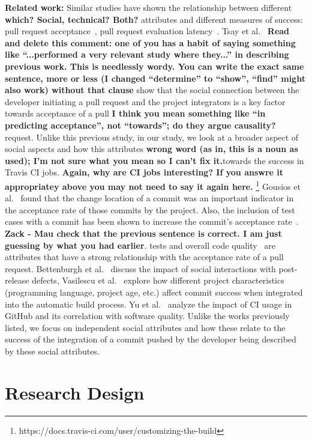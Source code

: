\documentclass[10pt, conference]{IEEEtran}
\newcommand{\todo}[1]
  {{\scriptsize \textbf{\color{red} {#1}}}}
\begin{document}
\textbf{Related work:}
Similar studies have shown the relationship between different\todo{which?
  Social, technical?  Both?} attributes and 
different measures of success: pull request acceptance~\cite{gousios14, 
gousios15,tsay14icse,tsay14fse}, pull request evaluation latency~\cite{Yu15}.
Tsay et al.~\cite{tsay14icse} \todo{Read and delete this comment: one of you has
  a habit of saying something like ``...performed a very relevant study where
  they...'' in describing previous work.  This is needlessly wordy.  You can
  write the exact same sentence, more or less (I changed ``determine'' to
  ``show'', ``find'' might also work) without that clause} 
show that the social connection between the developer initiating a
pull request and the project integrators is a key factor towards acceptance of a pull 
\todo{I think you mean something like ``in predicting acceptance'', not
  ``towards''; do they argue causality?}
request. Unlike this previous study, in our study, we look at a broader aspect of 
social aspects and how this attributes\todo{wrong word (as in, this is a noun as
  used); I'm not sure what you mean so I can't fix it.}towards the success in Travis
CI jobs.\todo{Again, why are CI jobs interesting?  If you answre it appropriatey
  above you may not need to say it again here.} \footnote{https://docs.travis-ci.com/user/customizing-the-build} 
Gousios et al.~\cite{gousios14} found that the change location of a commit was
an important indicator in the acceptance rate of those commits by the project.
Also, the inclusion of test cases with a commit has been shown to increase the
commit's acceptance rate~\cite{gousios15}.\todo{Zack - Mau check that the
previous sentence is correct.  I am just guessing by what you had earlier}.
tests and overall code quality~\cite{gousios15} are attributes that have a 
strong relationship with the acceptance rate of a pull request.
 Bettenburgh et 
al.~\cite{bettenburgh10} discuss the impact of social interactions with 
post-release defects, Vasilescu et al.~\cite{vasilescu14} explore how different 
project characteristics (programming language, project age, etc.) affect commit 
success when integrated into the automatic build process. Yu et al.~\cite{yu16} 
analyze the impact of CI usage in GitHub and its correlation with software 
quality. Unlike the works previously listed, we focus on independent social 
attributes and how these relate to the success of the integration of a commit 
pushed by the developer being described by these social attributes.

\section{Research Design}
\end{document}
